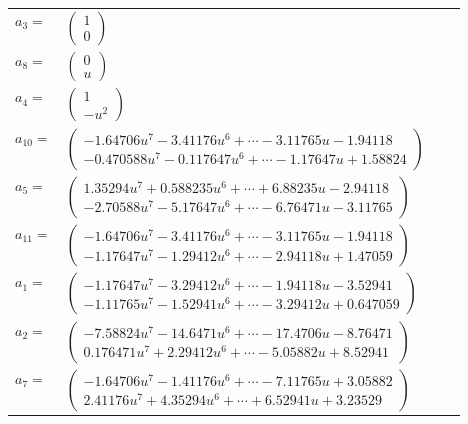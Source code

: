 \documentclass[1p]{elsarticle_modified}
\theoremstyle{definition}
\begin{document}
\begin{tabular}{m{7pt} m{180pt} m{7pt} m{180pt} }
\flushright $a_{3}=$&$\begin{pmatrix}1\\0\end{pmatrix}$ \\
\flushright $a_{8}=$&$\begin{pmatrix}0\\u\end{pmatrix}$ \\
\flushright $a_{4}=$&$\begin{pmatrix}1\\- u^2\end{pmatrix}$ \\
\flushright $a_{10}=$&$\begin{pmatrix}-1.64706 u^{7}-3.41176 u^{6}+\cdots-3.11765 u-1.94118\\-0.470588 u^{7}-0.117647 u^{6}+\cdots-1.17647 u+1.58824\end{pmatrix}$ \\
\flushright $a_{5}=$&$\begin{pmatrix}1.35294 u^{7}+0.588235 u^{6}+\cdots+6.88235 u-2.94118\\-2.70588 u^{7}-5.17647 u^{6}+\cdots-6.76471 u-3.11765\end{pmatrix}$ \\
\flushright $a_{11}=$&$\begin{pmatrix}-1.64706 u^{7}-3.41176 u^{6}+\cdots-3.11765 u-1.94118\\-1.17647 u^{7}-1.29412 u^{6}+\cdots-2.94118 u+1.47059\end{pmatrix}$ \\
\flushright $a_{1}=$&$\begin{pmatrix}-1.17647 u^{7}-3.29412 u^{6}+\cdots-1.94118 u-3.52941\\-1.11765 u^{7}-1.52941 u^{6}+\cdots-3.29412 u+0.647059\end{pmatrix}$ \\
\flushright $a_{2}=$&$\begin{pmatrix}-7.58824 u^{7}-14.6471 u^{6}+\cdots-17.4706 u-8.76471\\0.176471 u^{7}+2.29412 u^{6}+\cdots-5.05882 u+8.52941\end{pmatrix}$ \\
\flushright $a_{7}=$&$\begin{pmatrix}-1.64706 u^{7}-1.41176 u^{6}+\cdots-7.11765 u+3.05882\\2.41176 u^{7}+4.35294 u^{6}+\cdots+6.52941 u+3.23529\end{pmatrix}$ \\

\end{tabular}
\end{document}
